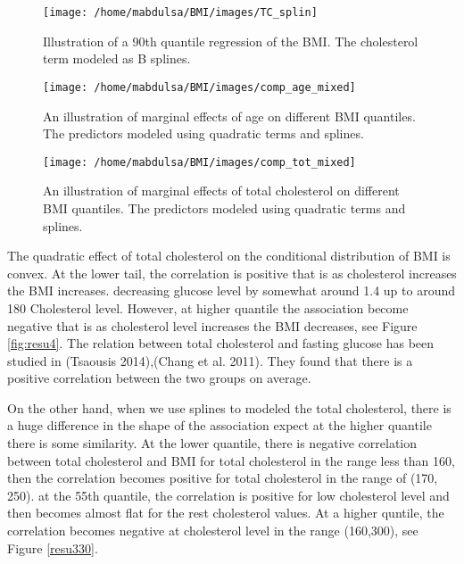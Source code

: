 \documentclass[
  12pt,
]{article}
\begin{document}
\begin{figure}

{\centering \texttt{[image: /home/mabdulsa/BMI/images/TC\_splin]} 

}

\caption{ Illustration of a 90th quantile regression of the BMI. The cholesterol term modeled  as B splines. }\label{fig:resu330}
\end{figure}

\begin{figure}

{\centering \texttt{[image: /home/mabdulsa/BMI/images/comp\_age\_mixed]} 

}

\caption{  An illustration of  marginal effects of age on different BMI quantiles. The predictors modeled using quadratic terms and splines.}\label{fig:resu1000}
\end{figure}

\begin{figure}

{\centering \texttt{[image: /home/mabdulsa/BMI/images/comp\_tot\_mixed]} 

}

\caption{ An illustration of  marginal effects of total cholesterol  on different BMI quantiles. The predictors modeled using quadratic terms and splines.}\label{fig:resu1010}
\end{figure}

The quadratic effect of total cholesterol on the conditional distribution of BMI is convex. At the lower tail, the correlation is positive that is as cholesterol increases the BMI increases. decreasing glucose level by somewhat around 1.4 up to around 180 Cholesterol level. However, at higher quantile the association become negative that is as cholesterol level increases the BMI decreases, see Figure \ref{fig:resu4}. The relation between total cholesterol and fasting glucose has been studied in (Tsaousis 2014),(Chang et al. 2011). They found that there is a positive correlation between the two groups on average.

On the other hand, when we use splines to modeled the total cholesterol, there is a huge difference in the shape of the association expect at the higher quantile there is some similarity. At the lower quantile, there is negative correlation between total cholesterol and BMI for total cholesterol in the range less than 160, then the correlation becomes positive for total cholesterol in the range of (170, 250). at the 55th quantile, the correlation is positive for low cholesterol level and then becomes almost flat for the rest cholesterol values. At a higher quntile, the correlation becomes negative at cholesterol level in the range (160,300), see Figure \ref{resu330}.
\end{document}

